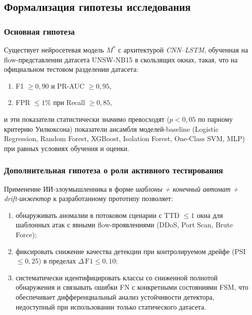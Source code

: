 \subsection{Формализация гипотезы исследования}

\subsubsection{Основная гипотеза}

\begin{statement}
Существует нейросетевая модель \(M^*\) с архитектурой \emph{CNN--LSTM},
обученная на flow-представлении датасета UNSW-NB15 в скользящих окнах,
такая, что на официальном тестовом разделении датасета:
\begin{enumerate}
    \item F1 \(\geq 0{,}90\) и PR-AUC \(\geq 0{,}95\),
    \item FPR \(\leq 1\%\) при Recall \(\geq 0{,}85\),
\end{enumerate}
и эти показатели статистически значимо превосходят (\(p < 0{,}05\) по парному
критерию Уилкоксона) показатели ансамбля моделей-baseline (Logistic
Regression, Random Forest, XGBoost, Isolation Forest, One-Class SVM, MLP)
при равных условиях обучения и оценки.
\end{statement}

\subsubsection{Дополнительная гипотеза о роли активного тестирования}

\begin{statement}
Применение ИИ-злоумышленника в форме \emph{шаблоны + конечный автомат +
drift-инжектор} к разработанному прототипу позволяет:
\begin{enumerate}
    \item обнаруживать аномалии в потоковом сценарии с TTD \(\leq 1\) окна
    для шаблонных атак с явными flow-проявлениями (DDoS, Port Scan, Brute
    Force);
    \item фиксировать снижение качества детекции при контролируемом
    дрейфе (PSI~\(\leq 0{,}25\)) в пределах \(\Delta\,\text{F1} \leq 0{,}10\);
    \item систематически идентифицировать классы со сниженной полнотой
    обнаружения и связывать ошибки FN с конкретными состояниями FSM, что
    обеспечивает дифференциальный анализ устойчивости детектора, недоступный
    при использовании только статического датасета.
\end{enumerate}
\end{statement}

